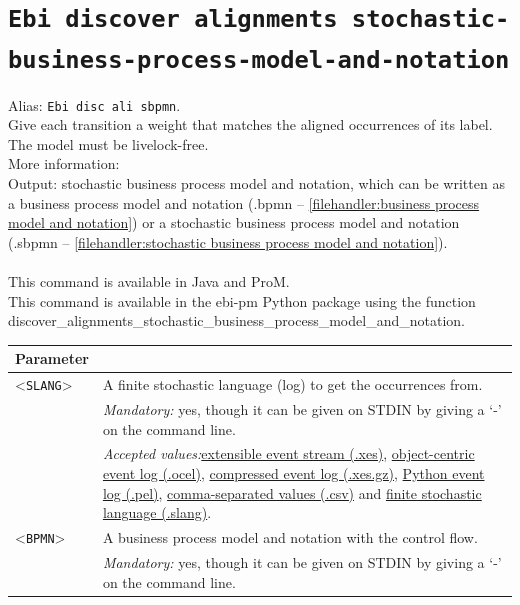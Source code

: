 {\clearpage\section{\texttt{Ebi discover alignments stochastic-business-process-model-and-notation}}
\label{command:Ebi discover alignments stochastic-business-process-model-and-notation}
Alias: \texttt{Ebi disc ali sbpmn}.\\
Give each transition a weight that matches the aligned occurrences of its label. The model must be livelock-free.\\
More information: ~\cite{DBLP:conf/icpm/BurkeLW20}~\\
\noindent Output: stochastic business process model and notation, which can be written as a business process model and notation (.bpmn -- \cref{filehandler:business process model and notation}) or a stochastic business process model and notation (.sbpmn -- \cref{filehandler:stochastic business process model and notation}).\\
\\This command is available in Java and ProM.
\\This command is available in the ebi-pm Python package using the function discover\_alignments\_stochastic\_business\_process\_model\_and\_notation.
\begin{tabularx}{\linewidth}{lX}
\toprule
Parameter \\\midrule
<\texttt{SLANG}>&A finite stochastic language (log) to get the occurrences from.\\
&\textit{Mandatory:} \quad yes, though it can be given on STDIN by giving a `-' on the command line.\\
&\textit{Accepted values:}\quad \hyperref[filehandler:extensible event stream]{extensible event stream (.xes)}, \hyperref[filehandler:object-centric event log]{object-centric event log (.ocel)}, \hyperref[filehandler:compressed event log]{compressed event log (.xes.gz)}, \hyperref[filehandler:Python event log]{Python event log (.pel)}, \hyperref[filehandler:comma-separated values]{comma-separated values (.csv)} and \hyperref[filehandler:finite stochastic language]{finite stochastic language (.slang)}.\\
<\texttt{BPMN}>&A business process model and notation with the control flow.\\
&\textit{Mandatory:} \quad yes, though it can be given on STDIN by giving a `-' on the command line.\\

\end{tabularx}}
